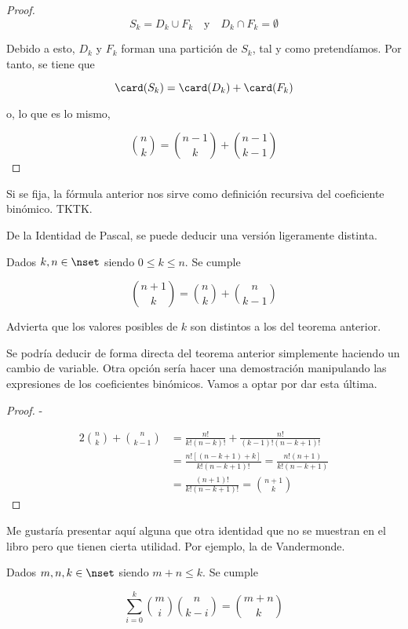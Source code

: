 \begin{proof}
  $$ S_k = D_k \cup F_k \quad \text{y} \quad D_k \cap F_k = \emptyset $$

  Debido a esto, $D_k$ y $F_k$ forman una partición de $S_k$, tal y como
  pretendíamos. Por tanto, se tiene que

  $$ \card(S_k) = \card(D_k) + \card(F_k) $$

  \noindent o, lo que es lo mismo,

  $$ {n \choose k} = {n-1 \choose k} + {n-1 \choose k-1} $$
\end{proof}

Si se fija, la fórmula anterior nos sirve como definición recursiva del
coeficiente binómico. TKTK.

De la Identidad de Pascal, se puede deducir una versión ligeramente distinta.

\begin{corollary}
  Dados $k, n \in \nset$ siendo $0 \leq k \leq n$. Se cumple

  $$ {n+1 \choose k} = {n \choose k} + {n \choose k-1} $$
\end{corollary}

Advierta que los valores posibles de $k$ son distintos a los del teorema
anterior.

Se podría deducir de forma directa del teorema anterior simplemente haciendo
un cambio de variable. Otra opción sería hacer una demostración manipulando
las expresiones de los coeficientes binómicos. Vamos a optar por dar esta
última.

\begin{proof}
  -

  \begin{alignat*}{2}
    {n \choose k} + {n \choose k-1}
      &= \frac{n!}{k! (n - k)!} + \frac{n!}{(k-1)! (n - k + 1)!} \\
      &= \frac{n! [(n - k + 1) + k]}{k! (n - k + 1)!} = \frac{n! (n + 1)}{k!
        (n - k + 1)} \\
      &= \frac{(n + 1)!}{k! (n - k + 1)!} = {n+1 \choose k}
  \end{alignat*}
\end{proof}

Me gustaría presentar aquí alguna que otra identidad que no se muestran en
el libro pero que tienen cierta utilidad. Por ejemplo, la de Vandermonde.

\begin{theorem}
  Dados $m, n, k \in \nset$ siendo $m + n \leq k$. Se cumple

  $$ \sum_{i=0}^k {m \choose i}{n \choose k-i} = {m+n \choose k} $$
\end{theorem}

